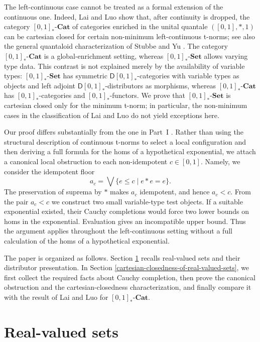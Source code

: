 \documentclass{birkau}
\theoremstyle{plain}
\theoremstyle{definition}
\newcommand{\sD}{\mathsf{D}}
\newcommand{\Cat}{\mathbf{Cat}}
\newcommand{\Set}{\mathbf{Set}}
\newcommand{\RSet}{[0,1]_*\text{-}\Set}
\renewcommand{\leq}{\leqslant}
\numberwithin{equation}{section}
\begin{document}
The left-continuous case cannot be treated as a formal extension of the continuous one. Indeed, Lai and Luo \cite{Lai2026a} show that, after continuity is dropped, the category $[0,1]_*\text{-}\Cat$ of categories enriched in the unital quantale $([0,1],*,1)$ can be cartesian closed for certain non-minimum left-continuous t-norms; see also the general quantaloid characterization of Stubbe and Yu \cite{Stubbe2026}. The category $[0,1]_*\text{-}\Cat$ is a global-enrichment setting, whereas $\RSet$ allows varying type data. This contrast is not explained merely by the availability of variable types: $\RSet$ has symmetric $\sD[0,1]_*$-categories with variable types as objects and left adjoint $\sD[0,1]_*$-distributors as morphisms, whereas $[0,1]_*\text{-}\Cat$ has $[0,1]_*$-categories and $[0,1]_*$-functors. We prove that $\RSet$ is cartesian closed only for the minimum t-norm; in particular, the non-minimum cases in the classification of Lai and Luo do not yield exceptions here.

Our proof differs substantially from the one in Part~I \cite{Shen2026}. Rather than using the structural description of continuous t-norms to select a local configuration and then deriving a full formula for the homs of a hypothetical exponential, we attach a canonical local obstruction to each non-idempotent $c\in[0,1]$. Namely, we consider the idempotent floor
\[
a_c=\bigvee\{e\leq c\mid e*e=e\}.
\]
The preservation of suprema by $*$ makes $a_c$ idempotent, and hence $a_c<c$. From the pair $a_c<c$ we construct two small variable-type test objects. If a suitable exponential existed, their Cauchy completions would force two lower bounds on homs in the exponential. Evaluation gives an incompatible upper bound. Thus the argument applies throughout the left-continuous setting without a full calculation of the homs of a hypothetical exponential.

The paper is organized as follows. Section \ref{real-valued-sets} recalls real-valued sets and their distributor presentation. In Section \ref{cartesian-closedness-of-real-valued-sets}, we first collect the required facts about Cauchy completion, then prove the canonical obstruction and the cartesian-closedness characterization, and finally compare it with the result of Lai and Luo for $[0,1]_*\text{-}\Cat$.

\section{Real-valued sets}
\label{real-valued-sets}
\end{document}
